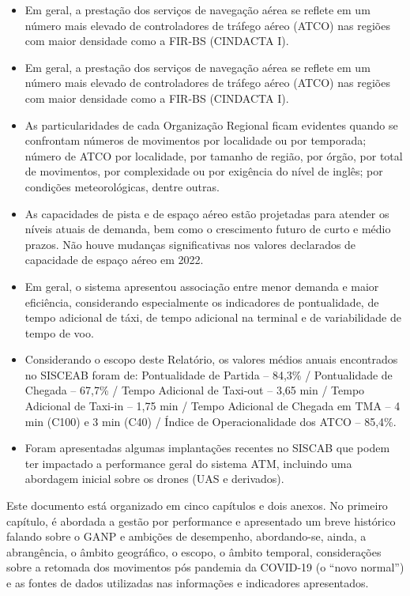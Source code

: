 \documentclass[
]{book}
\providecommand{\tightlist}{%
  \setlength{\itemsep}{0pt}\setlength{\parskip}{0pt}}
\begin{document}
\begin{itemize}
\tightlist
\item
  Em geral, a prestação dos serviços de navegação aérea se reflete em um número mais elevado de controladores de tráfego aéreo (ATCO) nas regiões com maior densidade como a FIR-BS (CINDACTA I).
\item
  Em geral, a prestação dos serviços de navegação aérea se reflete em um número mais elevado de controladores de tráfego aéreo (ATCO) nas regiões com maior densidade como a FIR-BS (CINDACTA I).
\item
  As particularidades de cada Organização Regional ficam evidentes quando se confrontam números de movimentos por localidade ou por temporada; número de ATCO por localidade, por tamanho de região, por órgão, por total de movimentos, por complexidade ou por exigência do nível de inglês; por condições meteorológicas, dentre outras.
\item
  As capacidades de pista e de espaço aéreo estão projetadas para atender os níveis atuais de demanda, bem como o crescimento futuro de curto e médio prazos. Não houve mudanças significativas nos valores declarados de capacidade de espaço aéreo em 2022.
\item
  Em geral, o sistema apresentou associação entre menor demanda e maior eficiência, considerando especialmente os indicadores de pontualidade, de tempo adicional de táxi, de tempo adicional na terminal e de variabilidade de tempo de voo.
\item
  Considerando o escopo deste Relatório, os valores médios anuais encontrados no SISCEAB foram de: Pontualidade de Partida -- 84,3\% / Pontualidade de Chegada -- 67,7\% / Tempo Adicional de Taxi-out -- 3,65 min / Tempo Adicional de Taxi-in -- 1,75 min / Tempo Adicional de Chegada em TMA -- 4 min (C100) e 3 min (C40) / Índice de Operacionalidade dos ATCO -- 85,4\%.
\item
  Foram apresentadas algumas implantações recentes no SISCAB que podem ter impactado a performance geral do sistema ATM, incluindo uma abordagem inicial sobre os drones (UAS e derivados).
\end{itemize}

Este documento está organizado em cinco capítulos e dois anexos. No primeiro capítulo, é abordada a gestão por performance e apresentado um breve histórico falando sobre o GANP e ambições de desempenho, abordando-se, ainda, a abrangência, o âmbito geográfico, o escopo, o âmbito temporal, considerações sobre a retomada dos movimentos pós pandemia da COVID-19 (o ``novo normal'') e as fontes de dados utilizadas nas informações e indicadores apresentados.
\end{document}
